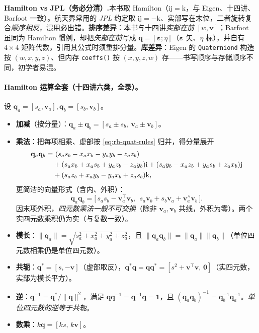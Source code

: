 \begin{note}
\textbf{Hamilton vs JPL（务必分清）.}\;本书取 Hamilton（$\mathrm{ij}=\mathrm{k}$，与 Eigen、十四讲、Barfoot 一致）。航天界常用的 \emph{JPL} 约定取 $\mathrm{ij}=-\mathrm{k}$、实部写在末位，二者旋转复合\emph{顺序相反}，混用必出错。\textbf{排序差异}：本书与十四讲\emph{实部在前} $[w,\mathbf{v}]$；Barfoot 虽同为 Hamilton 惯例，却把\emph{矢部在前}写成 $\mathbf{q}=[\boldsymbol{\varepsilon};\eta]$（$\boldsymbol{\varepsilon}$ 矢、$\eta$ 标），并自有 $4\times4$ 矩阵代数，引用其公式时须重排分量。\textbf{库差异}：Eigen 的 \texttt{Quaterniond} 构造按 $(w,x,y,z)$、但内存 \texttt{coeffs()} 按 $(x,y,z,w)$ 存——书写顺序与存储顺序不同，初学者易混。
\end{note}

\paragraph{Hamilton 运算全套（十四讲六类，全录）。}设 $\mathbf{q}_a=[s_a,\mathbf{v}_a],\mathbf{q}_b=[s_b,\mathbf{v}_b]$。
\begin{itemize}
\item \textbf{加减}（按分量）：$\mathbf{q}_a\pm\mathbf{q}_b=[s_a\pm s_b,\ \mathbf{v}_a\pm\mathbf{v}_b]$。
\item \textbf{乘法}：把每项相乘、虚部按 \cref{eq:rb-quat-rules} 归并，得分量展开
\begin{align}
  \mathbf{q}_a\mathbf{q}_b=&\ (s_as_b-x_ax_b-y_ay_b-z_az_b)\notag\\
  &+(s_ax_b+x_as_b+y_az_b-z_ay_b)\mathrm{i}+(s_ay_b-x_az_b+y_as_b+z_ax_b)\mathrm{j}\notag\\
  &+(s_az_b+x_ay_b-y_ax_b+z_as_b)\mathrm{k},
\end{align}
更简洁的向量形式（含内、外积）：
\begin{equation}
  \mathbf{q}_a\mathbf{q}_b=\big[\,s_as_b-\mathbf{v}_a^\top\mathbf{v}_b,\ \ s_a\mathbf{v}_b+s_b\mathbf{v}_a+\mathbf{v}_a^\wedge\mathbf{v}_b\,\big].
  \label{eq:quat-mul}
\end{equation}
因末项外积，\emph{四元数乘法一般不可交换}（除非 $\mathbf{v}_a,\mathbf{v}_b$ 共线，外积为零）。两个实四元数乘积仍为实（与复数一致）。
\item \textbf{模长}：$\|\mathbf{q}_a\|=\sqrt{s_a^2+x_a^2+y_a^2+z_a^2}$，且 $\|\mathbf{q}_a\mathbf{q}_b\|=\|\mathbf{q}_a\|\|\mathbf{q}_b\|$（单位四元数相乘仍是单位四元数）。
\item \textbf{共轭}：$\mathbf{q}^*=[s,-\mathbf{v}]$（虚部取反），$\mathbf{q}^*\mathbf{q}=\mathbf{q}\mathbf{q}^*=[s^2+\mathbf{v}^\top\mathbf{v},\,\mathbf{0}]$（实四元数，实部为模长平方）。
\item \textbf{逆}：$\mathbf{q}^{-1}=\mathbf{q}^*/\|\mathbf{q}\|^2$，满足 $\mathbf{q}\mathbf{q}^{-1}=\mathbf{q}^{-1}\mathbf{q}=\mathbf{1}$，且 $(\mathbf{q}_a\mathbf{q}_b)^{-1}=\mathbf{q}_b^{-1}\mathbf{q}_a^{-1}$。\emph{单位四元数的逆等于共轭}。
\item \textbf{数乘}：$k\mathbf{q}=[ks,\,k\mathbf{v}]$。
\end{itemize}

